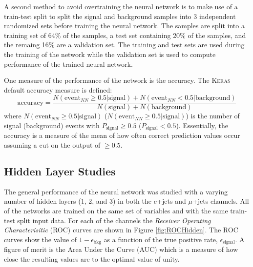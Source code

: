 A second method to avoid overtraining the neural network is to make use of a train-test split to split the signal and background samples into 3 independent randomized sets before training the neural network.  The samples are split into a training set of 64\% of the samples, a test set  containing 20\% of the samples, and the remaing 16\% are a validation set.  The training and test sets are used during the training of the network while the validation set is used to compute performance of the trained neural network.

One measure of the performance of the network is the accuracy. The \textsc{Keras} default accuracy measure is defined:
\[ \text{accuracy} = \frac{N(\text{event}_{NN} \geq 0.5|\text{signal})+ N(\text{event}_{NN} <0.5|\text{background})}{N(\text{signal})+N(\text{background})} \]
where $N(\text{event}_{NN} \geq 0.5|\text{signal})$ ($N(\text{event}_{NN} \geq 0.5|\text{signal})$) is the number of signal (background) events with $P_{\text{signal}}\geq 0.5$ ($P_{\text{signal}}< 0.5$).  Essentially, the accuracy is a measure of the mean of how often correct prediction values occur assuming a cut on the output of $\geq0.5$.



\subsection{Hidden Layer Studies}
\label{sec:HiddenStudies}
The general performance of the neural network was studied with a varying number of hidden layers (1, 2, and 3) in both the $e$+jets and $\mu$+jets channels.   All of the networks are trained on the same set of variables and with the same train-test split input data.  For each of the channels the \textit{Receiver Operating Characterisitic} (ROC) curves are shown in Figure \ref{fig:ROCHidden}.  The ROC curves show the value of $1-\epsilon_{\text{bkg}}$ as a function of the true positive rate, $\epsilon_{\text{signal}}$.  A figure of merit is the Area Under the Curve (AUC) which is a measure of how close the resulting values are to the optimal value of unity. 

